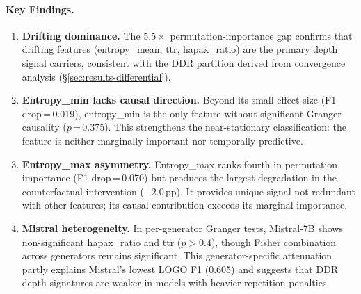 \begin{table}[ht]
\centering
\small
\caption{Granger causality (Fisher combined across 8 generators, lag\,=\,1, $N$\,=\,29{,}095). $\Delta R^2$ is reported where available.}
\label{tab:granger}
\end{table}

\paragraph{Key Findings.}
\begin{enumerate}[nosep,leftmargin=*]
\item \textbf{Drifting dominance.} The $5.5\times$ permutation-importance gap confirms that drifting features (entropy\_mean, ttr, hapax\_ratio) are the primary depth signal carriers, consistent with the DDR partition derived from convergence analysis (\S\ref{sec:results-differential}).

\item \textbf{Entropy\_min lacks causal direction.} Beyond its small effect size (F1 drop\,=\,0.019), entropy\_min is the only feature without significant Granger causality ($p$\,=\,0.375). This strengthens the near-stationary classification: the feature is neither marginally important nor temporally predictive.

\item \textbf{Entropy\_max asymmetry.} Entropy\_max ranks fourth in permutation importance (F1 drop\,=\,0.070) but produces the largest degradation in the counterfactual intervention ($-$2.0\,pp). It provides unique signal not redundant with other features; its causal contribution exceeds its marginal importance.

\item \textbf{Mistral heterogeneity.} In per-generator Granger tests, Mistral-7B shows non-significant hapax\_ratio and ttr ($p > 0.4$), though Fisher combination across generators remains significant. This generator-specific attenuation partly explains Mistral's lowest LOGO F1 (0.605) and suggests that DDR depth signatures are weaker in models with heavier repetition penalties.
\end{enumerate}
